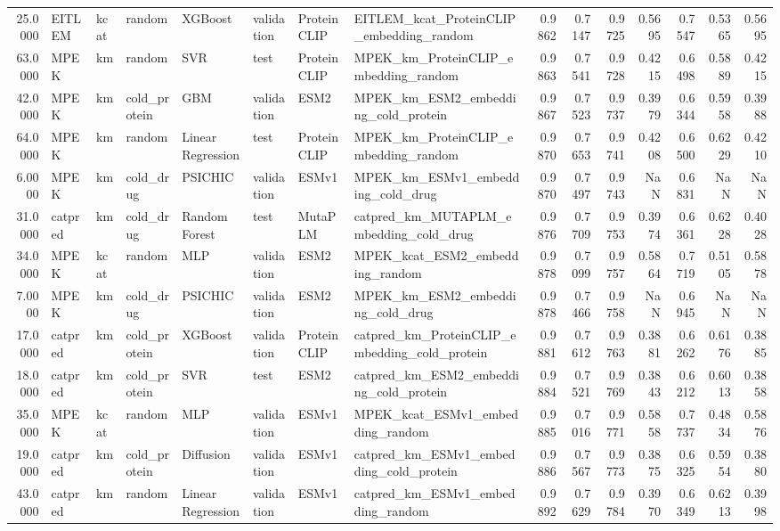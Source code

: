 \begin{tabular}{rlllllllrrrrrrr}
25.0000 & EITLEM & kcat & random & XGBoost & validation & ProteinCLIP & EITLEM_kcat_ProteinCLIP_embedding_random & 0.9862 & 0.7147 & 0.9725 & 0.5695 & 0.7547 & 0.5365 & 0.5695 \\
63.0000 & MPEK & km & random & SVR & test & ProteinCLIP & MPEK_km_ProteinCLIP_embedding_random & 0.9863 & 0.7541 & 0.9728 & 0.4215 & 0.6498 & 0.5889 & 0.4215 \\
42.0000 & MPEK & km & cold_protein & GBM & validation & ESM2 & MPEK_km_ESM2_embedding_cold_protein & 0.9867 & 0.7523 & 0.9737 & 0.3979 & 0.6344 & 0.5958 & 0.3988 \\
64.0000 & MPEK & km & random & Linear Regression & test & ProteinCLIP & MPEK_km_ProteinCLIP_embedding_random & 0.9870 & 0.7653 & 0.9741 & 0.4208 & 0.6500 & 0.6229 & 0.4210 \\
6.0000 & MPEK & km & cold_drug & PSICHIC & validation & ESMv1 & MPEK_km_ESMv1_embedding_cold_drug & 0.9870 & 0.7497 & 0.9743 & NaN & 0.6831 & NaN & NaN \\
31.0000 & catpred & km & cold_drug & Random Forest & test & MutaPLM & catpred_km_MUTAPLM_embedding_cold_drug & 0.9876 & 0.7709 & 0.9753 & 0.3974 & 0.6361 & 0.6228 & 0.4028 \\
34.0000 & MPEK & kcat & random & MLP & validation & ESM2 & MPEK_kcat_ESM2_embedding_random & 0.9878 & 0.7099 & 0.9757 & 0.5864 & 0.7719 & 0.5105 & 0.5878 \\
7.0000 & MPEK & km & cold_drug & PSICHIC & validation & ESM2 & MPEK_km_ESM2_embedding_cold_drug & 0.9878 & 0.7466 & 0.9758 & NaN & 0.6945 & NaN & NaN \\
17.0000 & catpred & km & cold_protein & XGBoost & validation & ProteinCLIP & catpred_km_ProteinCLIP_embedding_cold_protein & 0.9881 & 0.7612 & 0.9763 & 0.3881 & 0.6262 & 0.6176 & 0.3885 \\
18.0000 & catpred & km & cold_protein & SVR & test & ESM2 & catpred_km_ESM2_embedding_cold_protein & 0.9884 & 0.7521 & 0.9769 & 0.3843 & 0.6212 & 0.6013 & 0.3858 \\
35.0000 & MPEK & kcat & random & MLP & validation & ESMv1 & MPEK_kcat_ESMv1_embedding_random & 0.9885 & 0.7016 & 0.9771 & 0.5858 & 0.7737 & 0.4834 & 0.5876 \\
19.0000 & catpred & km & cold_protein & Diffusion & validation & ESMv1 & catpred_km_ESMv1_embedding_cold_protein & 0.9886 & 0.7567 & 0.9773 & 0.3875 & 0.6325 & 0.5954 & 0.3880 \\
43.0000 & catpred & km & random & Linear Regression & validation & ESMv1 & catpred_km_ESMv1_embedding_random & 0.9892 & 0.7629 & 0.9784 & 0.3970 & 0.6349 & 0.6213 & 0.3998 \\

\end{tabular}
